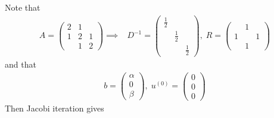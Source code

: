 
\usepackage[]{algorithm2e}


  \section{}
  \subsection{}
  Note that
  \begin{align}
    A =
    \begin{pmatrix}
      2&1&\\
      1&2&1\\
      &1&2
    \end{pmatrix}\implies
    &D^{-1} = \begin{pmatrix}
      \frac{1}{2}&&\\
      &\frac{1}{2}&\\
      &&\frac{1}{2}
    \end{pmatrix},\;
    R = \begin{pmatrix}
      &1&\\
      1&&1\\
      &1&
    \end{pmatrix}
  \end{align}
  and that
  \begin{align}
    b = \begin{pmatrix}
    \alpha\\0\\\beta
  \end{pmatrix},\; u^{(0)} = \begin{pmatrix}
  0\\0\\0
\end{pmatrix}
  \end{align}
  Then Jacobi iteration gives
